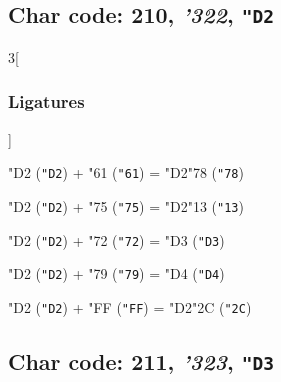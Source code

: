 \documentclass{article}
\newlength{\maxcharwidth}
\begin{document}
\subsection{Char code: 210, {\it'322}, {\tt"D2}}
\label{char_210}


\begin{multicols}{3}[\subsubsection{Ligatures}]

{\testfont\char"D2\noboundary} ({\tt"D2}) + {\testfont\char"61\noboundary} ({\tt"61}) = {\testfont\char"D2\noboundary}{\testfont\char"78\noboundary} ({\tt"78}) 

{\testfont\char"D2\noboundary} ({\tt"D2}) + {\testfont\char"75\noboundary} ({\tt"75}) = {\testfont\char"D2\noboundary}{\testfont\char"13\noboundary} ({\tt"13}) 

{\testfont\char"D2\noboundary} ({\tt"D2}) + {\testfont\char"72\noboundary} ({\tt"72}) = {\testfont\char"D3\noboundary} ({\tt"D3}) 

{\testfont\char"D2\noboundary} ({\tt"D2}) + {\testfont\char"79\noboundary} ({\tt"79}) = {\testfont\char"D4\noboundary} ({\tt"D4}) 

{\testfont\char"D2\noboundary} ({\tt"D2}) + {\testfont\char"FF\noboundary} ({\tt"FF}) = {\testfont\char"D2\noboundary}{\testfont\char"2C\noboundary} ({\tt"2C}) 

\end{multicols}

\subsection{Char code: 211, {\it'323}, {\tt"D3}}
\label{char_211}

\end{document}
